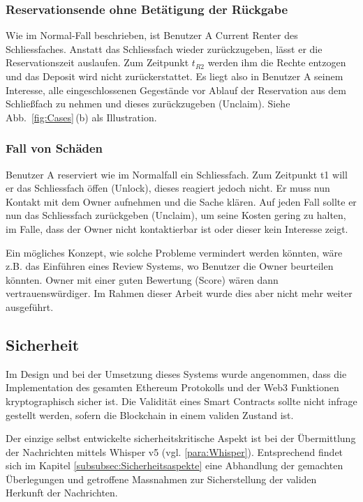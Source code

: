 \subsubsection{Reservationsende ohne Betätigung der Rückgabe}
Wie im Normal-Fall beschrieben, ist Benutzer A Current Renter des Schliessfaches. Anstatt das Schliessfach wieder zurückzugeben, lässt er die Reservationszeit auslaufen. Zum Zeitpunkt $t_{R2}$ werden ihm die Rechte entzogen und das Deposit wird nicht zurückerstattet. Es liegt also in Benutzer A seinem Interesse, alle eingeschlossenen Gegestände vor Ablauf der Reservation aus dem Schließfach zu nehmen und dieses zurückzugeben (Unclaim). Siehe Abb.~\ref{fig:Cases}\,(b) als Illustration.

\subsubsection{Fall von Schäden}
Benutzer A reserviert wie im Normalfall ein Schliessfach. Zum Zeitpunkt t1 will er das Schliessfach öffen (Unlock), dieses reagiert jedoch nicht. Er muss nun Kontakt mit dem Owner aufnehmen und die Sache klären. Auf jeden Fall sollte er nun das Schliessfach zurückgeben (Unclaim), um seine Kosten gering zu halten, im Falle, dass der Owner nicht kontaktierbar ist oder dieser kein Interesse zeigt.

Ein mögliches Konzept, wie solche Probleme vermindert werden könnten, wäre z.B. das Einführen eines Review Systems, wo Benutzer die Owner beurteilen könnten. Owner mit einer guten Bewertung (Score) wären dann vertrauenswürdiger. Im Rahmen dieser Arbeit wurde dies aber nicht mehr weiter ausgeführt. 

\subsection{Sicherheit}
Im Design und bei der Umsetzung dieses Systems wurde angenommen, dass die Implementation des gesamten Ethereum Protokolls und der Web3 Funktionen kryptographisch sicher ist. Die Validität eines Smart Contracts sollte nicht infrage gestellt werden, sofern die Blockchain in einem validen Zustand ist.\cite{github.com/ethereum/web3js, go-ethereum}

Der einzige selbst entwickelte sicherheitskritische Aspekt ist bei der Übermittlung der Nachrichten mittels Whisper v5 (vgl. \ref{para:Whisper}). Entsprechend findet sich im Kapitel \ref{subsubsec:Sicherheitsaspekte} eine Abhandlung der gemachten Überlegungen und getroffene Massnahmen zur Sicherstellung der validen Herkunft der Nachrichten.